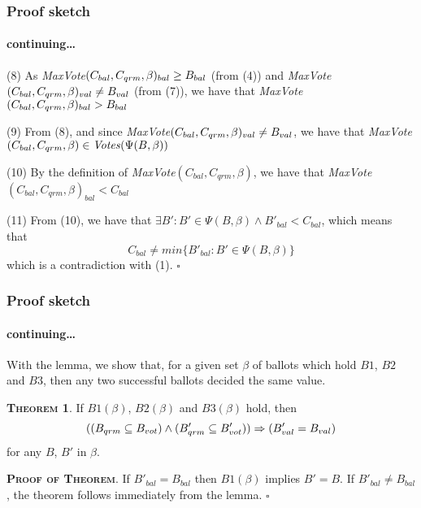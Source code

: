 \documentclass[10 pt]{beamer}
\begin{document}
\begin{frame}
\frametitle{Proof sketch}
\framesubtitle{continuing\ldots}

(8) As \textit{MaxVote}$(C_{bal}, C_{qrm}, \beta)_{bal} \geq B_{bal}$ (from (4)) and \textit{MaxVote}$(C_{bal}, C_{qrm}, \beta)_{val} \neq B_{val}$ (from (7)), we have that \textit{MaxVote}$(C_{bal}, C_{qrm}, \beta)_{bal} > B_{bal}$

\pause
\vspace{2 mm}
(9) From (8), and since \textit{MaxVote}$(C_{bal}, C_{qrm}, \beta)_{val} \neq B_{val}$, we have that \textit{MaxVote}$(C_{bal}, C_{qrm}, \beta) \in \text{\textit{Votes}}(\Psi(B,\beta))$ 

\pause
\vspace{2 mm}
(10) By the definition of \textit{MaxVote}$(C_{bal}, C_{qrm}, \beta)$, we have that \textit{MaxVote}$(C_{bal}, C_{qrm}, \beta)_{bal} < C_{bal}$

\pause
\vspace{2 mm}
(11) From (10), we have that $\exists B' : B' \in \Psi(B, \beta) \wedge B'_{bal} < C_{bal}$, which means that $$C_{bal} \neq min\{B'_{bal} : B' \in \Psi(B, \beta)\}$$ which is a contradiction with (1). $\square$

\end{frame}



\begin{frame}
\frametitle{Proof sketch}
\framesubtitle{continuing\ldots}

With the lemma, we show that, for a given set $\beta$ of ballots which hold $B1$, $B2$ and $B3$, then any two successful ballots decided the same value.

\vspace{2 mm}
\textbf{\textsc{Theorem 1}}. If $B1(\beta)$, $B2(\beta)$ and $B3(\beta)$ hold, then
$$((B_{qrm} \subseteq B_{vot}) \wedge (B'_{qrm} \subseteq B'_{vot})) \Rightarrow (B'_{val} = B_{val})$$
for any $B$, $B'$ in $\beta$.

\pause
\vspace{2 mm}
\textbf{\textsc{Proof of Theorem}}. If $B'_{bal} = B_{bal}$ then $B1(\beta)$ implies $B' = B$. If $B'_{bal} \neq B_{bal}$, the theorem follows immediately from the lemma. $\square$

\end{frame}
\end{document}
